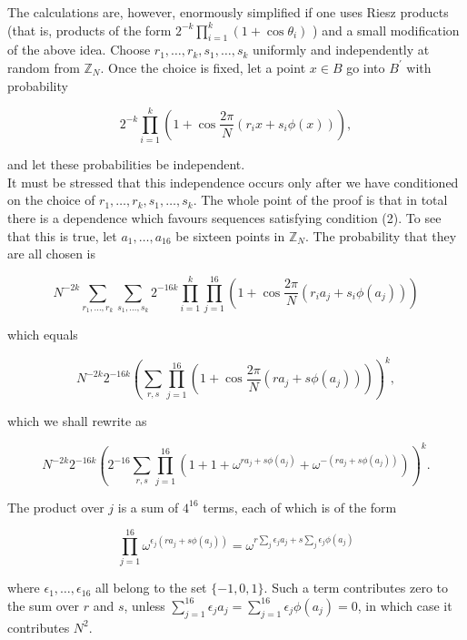 \documentclass[10pt]{article}
\begin{document}
The calculations are, however, enormously simplified if one uses Riesz products (that is, products of the form $2^{-k} \prod_{i=1}^{k}\left(1+\cos \theta_{i}\right)$ ) and a small modification of the above idea. Choose $r_{1}, \ldots, r_{k}, s_{1}, \ldots, s_{k}$ uniformly and independently at random from $\mathbb{Z}_{N}$. Once the choice is fixed, let a point $x \in B$ go into $B^{\prime}$ with probability

$$
2^{-k} \prod_{i=1}^{k}\left(1+\cos \frac{2 \pi}{N}\left(r_{i} x+s_{i} \phi(x)\right)\right),
$$

and let these probabilities be independent.\\
It must be stressed that this independence occurs only after we have conditioned on the choice of $r_{1}, \ldots, r_{k}, s_{1}, \ldots, s_{k}$. The whole point of the proof is that in total there is a dependence which favours sequences satisfying condition (2). To see that this is true, let $a_{1}, \ldots, a_{16}$ be sixteen points in $\mathbb{Z}_{N}$. The probability that they are all chosen is

$$
N^{-2 k} \sum_{r_{1}, \ldots, r_{k}} \sum_{s_{1}, \ldots, s_{k}} 2^{-16 k} \prod_{i=1}^{k} \prod_{j=1}^{16}\left(1+\cos \frac{2 \pi}{N}\left(r_{i} a_{j}+s_{i} \phi\left(a_{j}\right)\right)\right)
$$

which equals

$$
N^{-2 k} 2^{-16 k}\left(\sum_{r, s} \prod_{j=1}^{16}\left(1+\cos \frac{2 \pi}{N}\left(r a_{j}+s \phi\left(a_{j}\right)\right)\right)\right)^{k},
$$

which we shall rewrite as

$$
N^{-2 k} 2^{-16 k}\left(2^{-16} \sum_{r, s} \prod_{j=1}^{16}\left(1+1+\omega^{r a_{j}+s \phi\left(a_{j}\right)}+\omega^{-\left(r a_{j}+s \phi\left(a_{j}\right)\right)}\right)\right)^{k} .
$$

The product over $j$ is a sum of $4^{16}$ terms, each of which is of the form

$$
\prod_{j=1}^{16} \omega^{\epsilon_{j}\left(r a_{j}+s \phi\left(a_{j}\right)\right)}=\omega^{r \sum_{j} \epsilon_{j} a_{j}+s \sum_{j} \epsilon_{j} \phi\left(a_{j}\right)}
$$

where $\epsilon_{1}, \ldots, \epsilon_{16}$ all belong to the set $\{-1,0,1\}$. Such a term contributes zero to the sum over $r$ and $s$, unless $\sum_{j=1}^{16} \epsilon_{j} a_{j}=\sum_{j=1}^{16} \epsilon_{j} \phi\left(a_{j}\right)=0$, in which case it contributes $N^{2}$.
\end{document}
